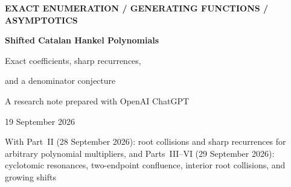\documentclass[11pt,a4paper]{article}
\numberwithin{equation}{section}
\theoremstyle{definition}
\theoremstyle{remark}
\begin{document}
\thispagestyle{empty}
\begin{center}
{\small\sffamily\bfseries\color{muted}EXACT ENUMERATION \quad / \quad GENERATING FUNCTIONS \quad / \quad ASYMPTOTICS}\par
\vspace{1mm}
{\LARGE\bfseries\color{inkblue}Shifted Catalan Hankel Polynomials}\par
\vspace{1mm}
{\Large Exact coefficients, sharp recurrences,\par and a denominator conjecture}\par
\vspace{1mm}
{A research note prepared with OpenAI ChatGPT}\par
{19 September 2026}\par
\vspace{1mm}
{\footnotesize\color{muted}With Part~II (28 September 2026): root collisions and sharp
recurrences for arbitrary polynomial multipliers,
and Parts~III--VI (29 September 2026): cyclotomic resonances,
two-endpoint confluence, interior root collisions, and growing shifts}
\end{center}
\vspace{1mm}
\end{document}
